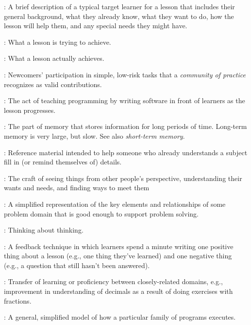 \begin{description}
: A brief description of a typical
target learner for a lesson that includes their general background, what they
already know, what they want to do, how the lesson will help them, and any
special needs they might have.

: What a lesson is trying to
achieve.

: What a lesson actually achieves.

: Newcomers' participation in simple, low-risk tasks that a
\emph{community of practice} recognizes as valid contributions.

: The act of teaching programming by writing
software in front of learners as the lesson progresses.

: The part of memory that stores
information for long periods of time. Long-term memory is very large, but
slow. See also \emph{short-term memory}.

: Reference material intended to help someone who
already understands a subject fill in (or remind themselves of) details.

: The craft of seeing things from other people's
perspective, understanding their wants and needs, and finding ways to meet them

: A simplified representation of the key
elements and relationships of some problem domain that is good enough to support
problem solving.

: Thinking about thinking.

: A feedback technique in which learners
spend a minute writing one positive thing about a lesson (e.g., one thing
they've learned) and one negative thing (e.g., a question that still hasn't been
answered).

: Transfer of learning or proficiency
between closely-related domains, e.g., improvement in understanding of decimals
as a result of doing exercises with fractions.

: A general, simplified model of how
a particular family of programs executes.


\end{description}
